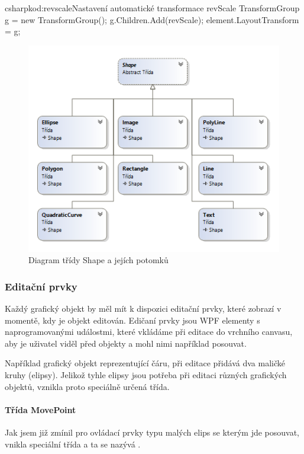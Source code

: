\documentclass[
  field=inf,
  biblatex,
  glossaries,
  index
]{kidiplom}
\begin{document}
\begin{kicode}{csharp}{kod:revscale}{Nastavení automatické transformace revScale}
TransformGroup g = new TransformGroup();
g.Children.Add(revScale);
element.LayoutTransform = g;
\end{kicode}


\begin{figure}
\includegraphics[width=15cm]{img/shape_diag}
\caption{Diagram třídy Shape a jejích potomků}
\end{figure}  

\subsubsection{Editační prvky}
Každý grafický objekt by měl mít k dispozici editační prvky, které zobrazí v momentě, kdy je objekt editován. Edičaní prvky jsou WPF elementy s naprogramovanými událostmi, které vkládáme při editace do vrchního canvasu, aby je uživatel viděl před objekty a mohl nimi například posouvat.

Například grafický objekt reprezentující čáru, při editace přidává dva maličké kruhy (elipsy). Jelikož tyhle elipsy jsou potřeba při editaci různých grafických objektů, vznikla proto speciálně určená třída.

\paragraph{Třída MovePoint}
Jak jsem již zmínil pro ovládací prvky typu malých elips se kterým jde posouvat, vnikla speciální třída a ta se nazývá .
\end{document}

